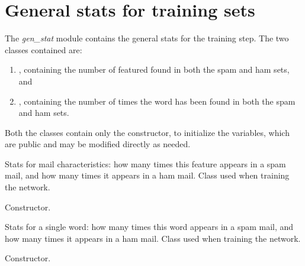 \documentclass[letterpaper,10pt,english]{sphinxmanual}
\begin{document}
\section{General stats for training sets}
\label{index:general-stats-for-training-sets}
The \emph{gen\_stat} module contains the general stats for the training step. The two classes contained are:
\begin{enumerate}
\item {} 
, containing the number of featured found in both the spam and ham sets, and

\item {} 
, containing the number of times the word has been found in both the spam and ham sets.

\end{enumerate}

Both the classes contain only the constructor, to initialize the variables, which are public and may be modified directly as needed.
\label{index:module-gen_stat}

\begin{fulllineitems}
\label{index:gen_stat.Stat}
Stats for mail characteristics: how many times this feature appears in
a spam mail, and how many times it appears in a ham mail. Class used when
training the network.

\begin{fulllineitems}
\label{index:gen_stat.Stat.__init__}
Constructor.

\end{fulllineitems}


\end{fulllineitems}


\begin{fulllineitems}
\label{index:gen_stat.Word}
Stats for a single word: how many times this word appears in a spam
mail, and how many times it appears in a ham mail. Class used when
training the network.

\begin{fulllineitems}
\label{index:gen_stat.Word.__init__}
Constructor.

\end{fulllineitems}


\end{fulllineitems}
\end{document}
